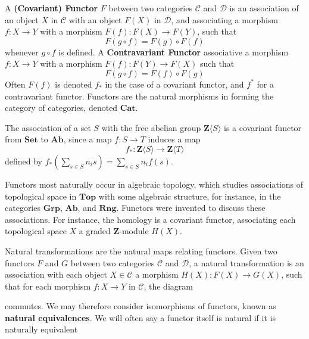 A {\bf (Covariant) Functor} $F$ between two categories $\mathcal{C}$ and $\mathcal{D}$ is an association of an object $X$ in $\mathcal{C}$ with an object $F(X)$ in $\mathcal{D}$, and associating a morphism $f: X \to Y$ with a morphism $F(f): F(X) \to F(Y)$, such that
%
\[ F(g \circ f) = F(g) \circ F(f) \]
%
whenever $g \circ f$ is defined. A {\bf Contravariant Functor} associative a morphism $f: X \to Y$ with a morphism $F(f): F(Y) \to F(X)$ such that
%
\[ F(g \circ f) = F(f) \circ F(g) \]
%
Often $F(f)$ is denoted $f_*$ in the case of a covariant functor, and $f^*$ for a contravariant functor. Functors are the natural morphisms in forming the category of categories, denoted $\mathbf{Cat}$.

\begin{example}
    The association of a set $S$ with the free abelian group $\mathbf{Z}\langle S \rangle$ is a covariant functor from $\mathbf{Set}$ to $\mathbf{Ab}$, since a map $f: S \to T$ induces a map
    \[ f_*: \mathbf{Z} \langle S \rangle \to \mathbf{Z} \langle T \rangle \]
    defined by $f_*(\sum_{s \in S} n_i s) = \sum_{s \in S} n_i f(s)$.
\end{example}

\begin{example}
    Functors most naturally occur in algebraic topology, which studies associations of topological space in $\mathbf{Top}$ with some algebraic structure, for instance, in the categories $\mathbf{Grp}$, $\mathbf{Ab}$, and $\mathbf{Rng}$. Functors were invented to discuss these associations. For instance, the homology is a covariant functor, associating each topological space $X$ a graded $\mathbf{Z}$-module $H(X)$.
\end{example}

Natural transformations are the natural maps relating functors. Given two functors $F$ and $G$ between two categories $\mathcal{C}$ and $\mathcal{D}$, a natural transformation is an association with each object $X \in \mathcal{C}$ a morphism $H(X): F(X) \to G(X)$, such that for each morphism $f: X \to Y$ in $\mathcal{C}$, the diagram
%
\begin{center}
\end{center}
%
commutes. We may therefore consider isomorphisms of functors, known as {\bf natural equivalences}. We will often say a functor itself is natural if it is naturally equivalent 

